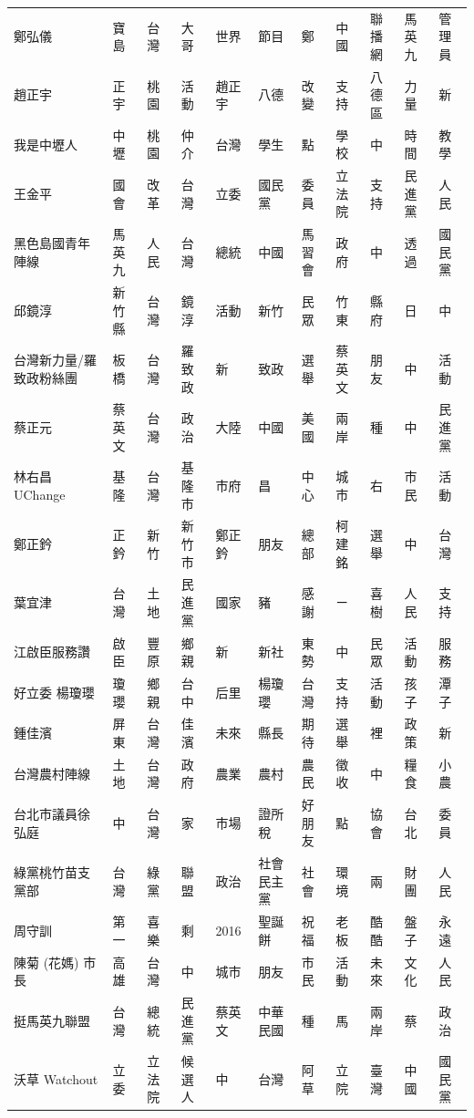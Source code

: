 \documentclass[letterpaper, 10pt, conference]{ieeeconf}   %
\begin{document}
\begin{CJK}{UTF8}{bsmi}
\begin{longtable}[c]{@{}L{2.45cm}L{1.1cm}L{1.1cm}L{1.1cm}L{1.1cm}L{1.1cm}L{1.1cm}L{1.1cm}L{1.1cm}L{1.1cm}L{1.1cm}@{}}
鄭弘儀 & 寶島 & 台灣 & 大哥 & 世界 & 節目 & 鄭 & 中國 & 聯播網 & 馬英九 & 管理員 \\
趙正宇 & 正宇 & 桃園 & 活動 & 趙正宇 & 八德 & 改變 & 支持 & 八德區 & 力量 & 新 \\
我是中壢人 & 中壢 & 桃園 & 仲介 & 台灣 & 學生 & 點 & 學校 & 中 & 時間 & 教學 \\
王金平 & 國會 & 改革 & 台灣 & 立委 & 國民黨 & 委員 & 立法院 & 支持 & 民進黨 & 人民 \\
黑色島國青年陣線 & 馬英九 & 人民 & 台灣 & 總統 & 中國 & 馬習會 & 政府 & 中 & 透過 & 國民黨 \\
邱鏡淳 & 新竹縣 & 台灣 & 鏡淳 & 活動 & 新竹 & 民眾 & 竹東 & 縣府 & 日 & 中 \\
台灣新力量/羅致政粉絲團 & 板橋 & 台灣 & 羅致政 & 新 & 致政 & 選舉 & 蔡英文 & 朋友 & 中 & 活動 \\
蔡正元 & 蔡英文 & 台灣 & 政治 & 大陸 & 中國 & 美國 & 兩岸 & 種 & 中 & 民進黨 \\
林右昌UChange & 基隆 & 台灣 & 基隆市 & 市府 & 昌 & 中心 & 城市 & 右 & 市民 & 活動 \\
鄭正鈐 & 正鈐 & 新竹 & 新竹市 & 鄭正鈐 & 朋友 & 總部 & 柯建銘 & 選舉 & 中 & 台灣 \\
葉宜津 & 台灣 & 土地 & 民進黨 & 國家 & 豬 & 感謝 & ㄧ & 喜樹 & 人民 & 支持 \\
江啟臣服務讚 & 啟臣 & 豐原 & 鄉親 & 新 & 新社 & 東勢 & 中 & 民眾 & 活動 & 服務 \\
好立委 楊瓊瓔 & 瓊瓔 & 鄉親 & 台中 & 后里 & 楊瓊瓔 & 台灣 & 支持 & 活動 & 孩子 & 潭子 \\
鍾佳濱 & 屏東 & 台灣 & 佳濱 & 未來 & 縣長 & 期待 & 選舉 & 裡 & 政策 & 新 \\
台灣農村陣線 & 土地 & 台灣 & 政府 & 農業 & 農村 & 農民 & 徵收 & 中 & 糧食 & 小農 \\
台北市議員徐弘庭 & 中 & 台灣 & 家 & 市場 & 證所稅 & 好朋友 & 點 & 協會 & 台北 & 委員 \\
綠黨桃竹苗支黨部 & 台灣 & 綠黨 & 聯盟 & 政治 & 社會民主黨 & 社會 & 環境 & 兩 & 財團 & 人民 \\
周守訓 & 第一 & 喜樂 & 剩 & 2016 & 聖誕餅 & 祝福 & 老板 & 酷酷 & 盤子 & 永遠 \\
陳菊 (花媽) 市長 & 高雄 & 台灣 & 中 & 城市 & 朋友 & 市民 & 活動 & 未來 & 文化 & 人民 \\
挺馬英九聯盟 & 台灣 & 總統 & 民進黨 & 蔡英文 & 中華民國 & 種 & 馬 & 兩岸 & 蔡 & 政治 \\
沃草 Watchout & 立委 & 立法院 & 候選人 & 中 & 台灣 & 阿草 & 立院 & 臺灣 & 中國 & 國民黨 \\

\end{longtable}
\end{CJK}
\end{document}
